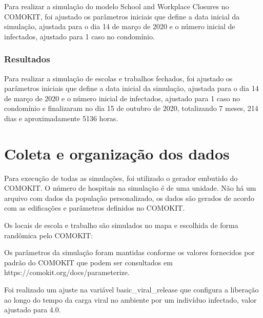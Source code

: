 Para realizar a simulação do modelo School and Workplace Closures no COMOKIT, foi ajustado os parâmetros iniciais que define a data inicial da simulação, ajustada para o dia 14 de março de 2020 e o número inicial de infectados, ajustado para 1 caso no condomínio.


\subsubsection{Resultados}

Para realizar a simulação de escolas e trabalhos fechados, foi ajustado os parâmetros iniciais que define a data inicial da simulação, ajustada para o dia 14 de março de 2020 e o número inicial de infectados, ajustado para 1 caso no condomínio e finalizaram no dia 15 de outubro de 2020, totalizando 7 meses, 214 dias e aproximadamente 5136 horas.



\section{Coleta e organização dos dados}

Para execução de todas as simulações, foi utilizado o gerador embutido do COMOKIT. O número de hospitais na simulação é de uma unidade. Não há um arquivo com dados da população personalizado, os dados são gerados de acordo com as edificações e parâmetros definidos no COMOKIT.

Os locais de escola e trabalho são simulados no mapa e escolhida de forma randômica pelo COMOKIT:


Os parâmetros da simulação foram mantidas conforme os valores fornecidos por padrão do COMOKIT que podem ser consultados em https://comokit.org/docs/parameterize.

Foi realizado um ajuste na variável basic\_viral\_release que configura a liberação ao longo do tempo da carga viral no ambiente por um indivíduo infectado, valor ajustado para 4.0.

